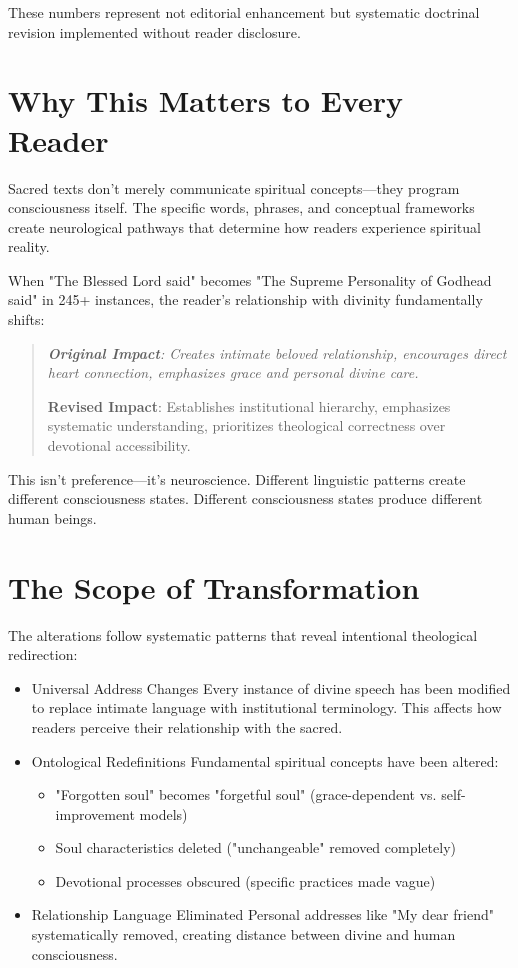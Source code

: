 \documentclass[11pt,twoside]{book}
\begin{document}
These numbers represent not editorial enhancement but systematic doctrinal revision implemented without reader disclosure.
\section*{Why This Matters to Every Reader}
\label{sec:org0684235}

Sacred texts don't merely communicate spiritual concepts—they program consciousness itself. The specific words, phrases, and conceptual frameworks create neurological pathways that determine how readers experience spiritual reality.

When "The Blessed Lord said" becomes "The Supreme Personality of Godhead said" in 245+ instances, the reader's relationship with divinity fundamentally shifts:

\begin{quotation}\itshape
\textbf{Original Impact}: Creates intimate beloved relationship, encourages direct heart connection, emphasizes grace and personal divine care.

\textbf{Revised Impact}: Establishes institutional hierarchy, emphasizes systematic understanding, prioritizes theological correctness over devotional accessibility.
\end{quotation}

This isn't preference—it's neuroscience. Different linguistic patterns create different consciousness states. Different consciousness states produce different human beings.
\section*{The Scope of Transformation}
\label{sec:org5765d86}

The alterations follow systematic patterns that reveal intentional theological redirection:
\begin{itemize}
\item Universal Address Changes
\label{sec:orga85f9b8}
Every instance of divine speech has been modified to replace intimate language with institutional terminology. This affects how readers perceive their relationship with the sacred.
\item Ontological Redefinitions
\label{sec:org3cd7d3e}
Fundamental spiritual concepts have been altered:
\begin{itemize}
\item "Forgotten soul" becomes "forgetful soul" (grace-dependent vs. self-improvement models)
\item Soul characteristics deleted ("unchangeable" removed completely)
\item Devotional processes obscured (specific practices made vague)
\end{itemize}
\item Relationship Language Eliminated
\label{sec:orgd63a7ba}
Personal addresses like "My dear friend" systematically removed, creating distance between divine and human consciousness.

\clearpage
\end{itemize}
\end{document}
